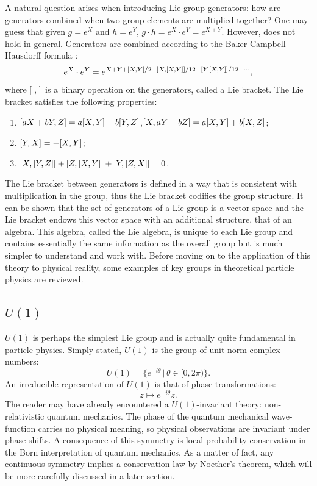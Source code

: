 A natural question arises when introducing Lie group generators: how are generators combined when two group elements are multiplied together? One may guess that given $g = e^X$ and $h = e^Y$, $g\cdot h = e^X\cdot e^Y = e^{X+Y}$. However, does not hold in general. Generators are combined according to the Baker-Campbell-Hausdorff formula \cite{schwichtenberg_physics_2017}: $$e^{X}\cdot e^{Y} = e^{X+Y+\comm{X}{Y}/2+\comm{X}{\comm{X}{Y}}/12-\comm{Y}{\comm{X}{Y}}/12+\dotsb},$$ where $\comm{\;}{\;}$ is a binary operation on the generators, called a Lie bracket. The Lie bracket satisfies the following properties:
\begin{enumerate}
    \item $\comm{aX+bY}{Z}=a\comm{X}{Y}+b\comm{Y}{Z}$,\newline $\comm{X}{aY+bZ}=a\comm{X}{Y}+b\comm{X}{Z}$;
    \item $\comm{Y}{X}=-\comm{X}{Y}$;
    \item $\comm{X}{\comm{Y}{Z}}+\comm{Z}{\comm{X}{Y}}+\comm{Y}{\comm{Z}{X}}=0$.
\end{enumerate}
The Lie bracket between generators is defined in a way that is consistent with multiplication in the group, thus the Lie bracket codifies the group structure. It can be shown that the set of generators of a Lie group is a vector space and the Lie bracket endows this vector space with an additional structure, that of an algebra. This algebra, called the Lie algebra, is unique to each Lie group and contains essentially the same information as the overall group but is much simpler to understand and work with. Before moving on to the application of this theory to physical reality, some examples of key groups in theoretical particle physics are reviewed.

\subsection{\texorpdfstring{$U(1)$}{U(1)}}
$U(1)$ is perhaps the simplest Lie group and is actually quite fundamental in particle physics. Simply stated, $U(1)$ is the group of unit-norm complex numbers: $$U(1) = \{e^{-i\theta}\,|\,\theta \in [0,2\pi) \}.$$ An irreducible representation of $U(1)$ is that of phase transformations: $$z \longmapsto e^{-i\theta}z.$$ The reader may have already encountered a $U(1)$-invariant theory: non-relativistic quantum mechanics. The phase of the quantum mechanical wave-function carries no physical meaning, so physical observations are invariant under phase shifts. A consequence of this symmetry is local probability conservation in the Born interpretation of quantum mechanics. As a matter of fact, any continuous symmetry implies a conservation law by Noether's theorem, which will be more carefully discussed in a later section.

